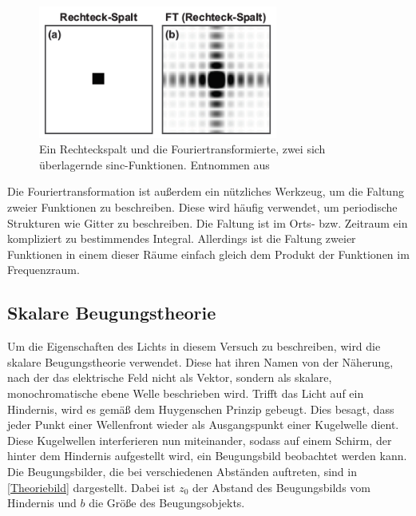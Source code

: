 \begin{figure}[h!]
	\centering
	\includegraphics[width=0.7\textwidth]{rechteckspalt.PNG}
	\caption{Ein Rechteckspalt und die Fouriertransformierte, zwei sich überlagernde sinc-Funktionen. Entnommen aus \autocite{anleitung-ws2014}}
	\label{rechteckspalt}
\end{figure}

Die Fouriertransformation ist außerdem ein nützliches Werkzeug, um die Faltung zweier Funktionen zu beschreiben. Diese wird häufig verwendet, um periodische Strukturen wie Gitter zu beschreiben. Die Faltung ist im Orts- bzw. Zeitraum ein kompliziert zu bestimmendes Integral. Allerdings ist die Faltung zweier Funktionen in einem dieser Räume einfach gleich dem Produkt der Funktionen im Frequenzraum.

\subsection{Skalare Beugungstheorie}
Um die Eigenschaften des Lichts in diesem Versuch zu beschreiben, wird die skalare Beugungstheorie verwendet. Diese hat ihren Namen von der Näherung, nach der das elektrische Feld nicht als Vektor, sondern als skalare, monochromatische ebene Welle beschrieben wird. Trifft das Licht auf ein Hindernis, wird es gemäß dem Huygenschen Prinzip gebeugt. Dies besagt, dass jeder Punkt einer Wellenfront wieder als Ausgangspunkt einer Kugelwelle dient. Diese Kugelwellen interferieren nun miteinander, sodass auf einem Schirm, der hinter dem Hindernis aufgestellt wird, ein Beugungsbild beobachtet werden kann. Die Beugungsbilder, die bei verschiedenen Abständen auftreten, sind in \cref{Theoriebild} dargestellt. Dabei ist $z_0$ der Abstand des Beugungsbilds vom Hindernis und $b$ die Größe des Beugungsobjekts.


